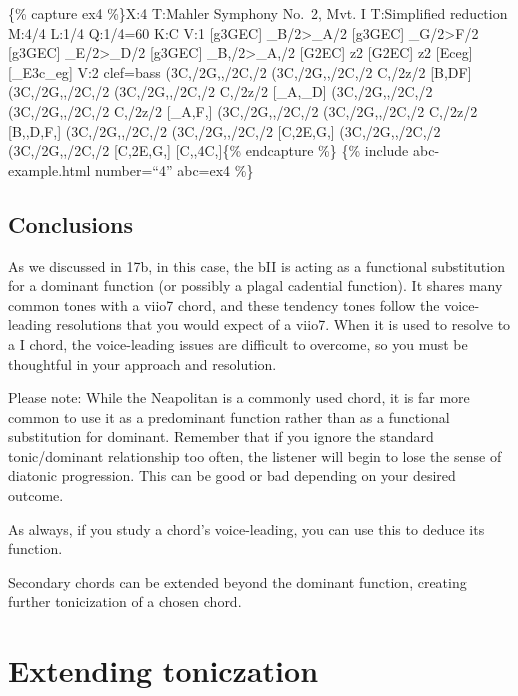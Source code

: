 \documentclass{book}
\begin{document}
\{\% capture ex4 \%\}X:4 T:Mahler Symphony No.~2, Mvt. I T:Simplified
reduction M:4/4 L:1/4 Q:1/4=60 K:C V:1 {[}g3GEC{]}
\_B/2\textgreater\_A/2\textbar{} {[}g3GEC{]} \_G/2\textgreater F/2\textbar{}
{[}g3GEC{]} \_E/2\textgreater\_D/2\textbar{} {[}g3GEC{]}
\_B,/2\textgreater\_A,/2\textbar{} {[}G2EC{]} z2\textbar{} {[}G2EC{]}
z2\textbar{} {[}Eceg{]} {[}\_E3c\_eg{]}\textbar{]} V:2 clef=bass
(3C,/2G,,/2C,/2 (3C,/2G,,/2C,/2 C,/2z/2 {[}B,DF{]}\textbar{} (3C,/2G,,/2C,/2
(3C,/2G,,/2C,/2 C,/2z/2 {[}\_A,\_D{]}\textbar{} (3C,/2G,,/2C,/2
(3C,/2G,,/2C,/2 C,/2z/2 {[}\_A,F,{]}\textbar{} (3C,/2G,,/2C,/2 (3C,/2G,,/2C,/2
C,/2z/2 {[}B,,D,F,{]}\textbar{} (3C,/2G,,/2C,/2 (3C,/2G,,/2C,/2
{[}C,2E,G,{]}\textbar{} (3C,/2G,,/2C,/2 (3C,/2G,,/2C,/2
{[}C,2E,G,{]}\textbar{} {[}C,,4C,{]}\textbar{]}\{\% endcapture \%\} \{\%
include abc-example.html number=``4'' abc=ex4 \%\}

\hypertarget{conclusions-32}{%
\subsection{Conclusions}\label{conclusions-32}}

As we discussed in 17b, in this case, the bII is acting as a functional
substitution for a dominant function (or possibly a plagal cadential
function). It shares many common tones with a viio7 chord, and these tendency
tones follow the voice-leading resolutions that you would expect of a viio7.
When it is used to resolve to a I chord, the voice-leading issues are
difficult to overcome, so you must be thoughtful in your approach and
resolution.

Please note: While the Neapolitan is a commonly used chord, it is far more
common to use it as a predominant function rather than as a functional
substitution for dominant. Remember that if you ignore the standard
tonic/dominant relationship too often, the listener will begin to lose the
sense of diatonic progression. This can be good or bad depending on your
desired outcome.

As always, if you study a chord's voice-leading, you can use this to deduce
its function.

Secondary chords can be extended beyond the dominant function, creating
further tonicization of a chosen chord.

\hypertarget{extending-toniczation}{%
\section{Extending toniczation}\label{extending-toniczation}}
\end{document}
